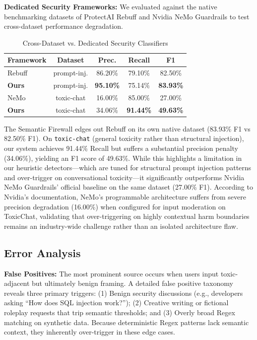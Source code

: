 \documentclass[conference]{IEEEtran}
\begin{document}
\textbf{Dedicated Security Frameworks:} We evaluated against the native benchmarking datasets of ProtectAI Rebuff and Nvidia NeMo Guardrails to test cross-dataset performance degradation.

\begin{table}[htbp]
\centering
\caption{Cross-Dataset vs. Dedicated Security Classifiers}
\label{tab:dedicated-classifiers}
\begin{tabular}{@{}lcccc@{}}
\toprule
\textbf{Framework} & \textbf{Dataset} & \textbf{Prec.} & \textbf{Recall} & \textbf{F1} \\
\midrule
Rebuff & prompt-inj. & 86.20\% & 79.10\% & 82.50\% \\
\textbf{Ours} & prompt-inj. & \textbf{95.10\%} & 75.14\% & \textbf{83.93\%} \\
\midrule
NeMo & toxic-chat & 16.00\% & 85.00\% & 27.00\% \\
\textbf{Ours} & toxic-chat & 34.06\% & \textbf{91.44\%} & \textbf{49.63\%} \\
\bottomrule
\end{tabular}
\end{table}

The Semantic Firewall edges out Rebuff on its own native dataset (83.93\% F1 vs 82.50\% F1). On \texttt{toxic-chat} (general toxicity rather than structural injection), our system achieves 91.44\% Recall but suffers a substantial precision penalty (34.06\%), yielding an F1 score of 49.63\%. While this highlights a limitation in our heuristic detectors---which are tuned for structural prompt injection patterns and over-trigger on conversational toxicity---it significantly outperforms Nvidia NeMo Guardrails' official baseline on the same dataset (27.00\% F1). According to Nvidia's documentation, NeMo's programmable architecture suffers from severe precision degradation (16.00\%) when configured for input moderation on ToxicChat, validating that over-triggering on highly contextual harm boundaries remains an industry-wide challenge rather than an isolated architecture flaw.

\subsection{Error Analysis}

\textbf{False Positives:} The most prominent source occurs when users input toxic-adjacent but ultimately benign framing. A detailed false positive taxonomy reveals three primary triggers: (1) Benign security discussions (e.g., developers asking ``How does SQL injection work?''); (2) Creative writing or fictional roleplay requests that trip semantic thresholds; and (3) Overly broad Regex matching on synthetic data. Because deterministic Regex patterns lack semantic context, they inherently over-trigger in these edge cases.
\end{document}
